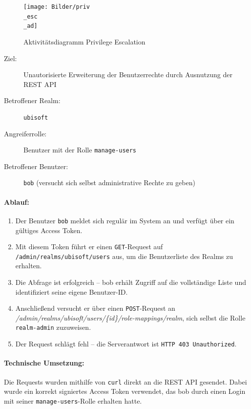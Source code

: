 \documentclass[a4paper,12pt]{article}
\begin{document}
	\begin{figure}
		\centering
		\texttt{[image: Bilder/priv\\\_esc\\\_ad]}
		\caption{Aktivitätsdiagramm Privilege Escalation}
		\label{fig:privescad}
	\end{figure}
	
	
	\begin{description}
		\item[Ziel:] Unautorisierte Erweiterung der Benutzerrechte durch Ausnutzung der REST API
		\item[Betroffener Realm:] \texttt{ubisoft}
		\item[Angreiferrolle:] Benutzer mit der Rolle \texttt{manage-users}
		\item[Betroffener Benutzer:] \texttt{bob} (versucht sich selbst administrative Rechte zu geben)
	\end{description}
	
	\paragraph{Ablauf:}
	\begin{enumerate}
		\item Der Benutzer \texttt{bob} meldet sich regulär im System an und verfügt über ein gültiges Access Token.
		\item Mit diesem Token führt er einen \texttt{GET}-Request auf \texttt{/admin/realms/ubisoft/users} aus, um die Benutzerliste des Realms zu erhalten.
		\item Die Abfrage ist erfolgreich – bob erhält Zugriff auf die vollständige Liste und identifiziert seine eigene Benutzer-ID.
		\item Anschließend versucht er über einen \texttt{POST}-Request 
		an 
		\textit{/admin/realms/ubisoft/users/\{id\}/role-mappings/realm}, 
		sich selbst die Rolle \texttt{realm-admin} zuzuweisen.
		\item Der Request schlägt fehl – die Serverantwort ist \texttt{HTTP 403 Unauthorized}.
	\end{enumerate}
	
	\paragraph{Technische Umsetzung:}
	Die Requests wurden mithilfe von \texttt{curl} direkt an die REST API gesendet. Dabei wurde ein korrekt signiertes Access Token verwendet, das bob durch einen Login mit seiner \texttt{manage-users}-Rolle erhalten hatte.
	
\end{document}
